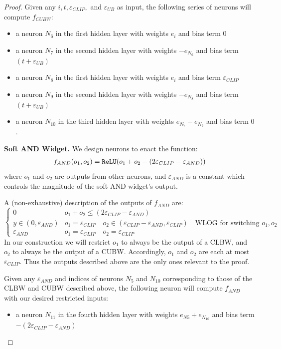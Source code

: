 \begin{proof}
Given any $i,t, \varepsilon_{CLIP},$ and $\varepsilon_{UB}$ as input, the following series of neurons will compute $f_{CUBW}:$
\begin{itemize}
    \item a neuron $N_6$ in the first hidden layer with weights $e_i$ and bias term $0$
    \item a neuron $N_7$ in the second hidden layer with weights $-e_{N_6}$ and bias term $(t + \varepsilon_{UB})$
    \item a neuron $N_8$ in the first hidden layer with weights $e_{i}$ and bias term $\varepsilon_{CLIP}$
    \item a neuron $N_9$ in the second hidden layer with weights $-e_{N_8}$ and bias term $(t + \varepsilon_{UB})$
    \item a neuron $N_{10}$ in the third hidden layer with weights $e_{N_7} - e_{N_9}$ and bias term $0$.
\end{itemize}

\textbf{Soft AND Widget.} We design neurons to enact the function:
\begin{align*}
    f_{AND}(o_1, o_2) = \texttt{ReLU}(o_1 + o_2 - (2\varepsilon_{CLIP} - \varepsilon_{AND}))
\end{align*}
where $o_1$ and $o_2$ are outputs from other neurons, and $\varepsilon_{AND}$ is a constant which controls the magnitude of the soft AND widget's output.

A (non-exhaustive) description of the outputs of $f_{AND}$ are:
\[ \begin{cases} 
      0 & o_1 + o_2 \leq (2\varepsilon_{CLIP} - \varepsilon_{AND}) \\
      y \in (0, \varepsilon_{AND}) & o_1 = \varepsilon_{CLIP} \quad o_2 \in (\varepsilon_{CLIP}-\varepsilon_{AND}, \varepsilon_{CLIP}) \quad \text{WLOG for switching } o_1, o_2 \\
      \varepsilon_{AND} & o_1 = \varepsilon_{CLIP} \quad o_2 = \varepsilon_{CLIP}
   \end{cases}
\]
In our construction we will restrict $o_1$ to always be the output of a CLBW, and $o_2$ to always be the output of a CUBW. Accordingly, $o_1$ and $o_2$ are each at most $\varepsilon_{CLIP}$. Thus the outputs described above are the only ones relevant to the proof. %

Given any $\varepsilon_{AND}$ and indices of neurons $N_5$ and $N_{10}$ corresponding to those of the CLBW and CUBW described above, the following neuron will compute $f_{AND}$ with our desired restricted inputs:
\begin{itemize}
    \item a neuron $N_{11}$ in the fourth hidden layer with weights $e_{N5} + e_{N_10}$ and bias term $-(2\varepsilon_{CLIP} - \varepsilon_{AND})$
\end{itemize}


\end{proof}
